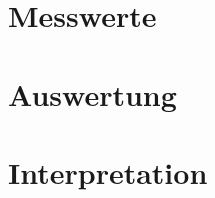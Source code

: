 \documentclass[TGAI_Laborbericht.tex]{subfiles}
\begin{document}
\section{Messwerte}
\label{chap:VERSUCH_1_MESSWERTE}

\section{Auswertung}
\label{chap:VERSUCH_1_AUSWERTUNG}

\section{Interpretation}
\label{chap:VERSUCH_1_INTERPRETATION}
\end{document}
